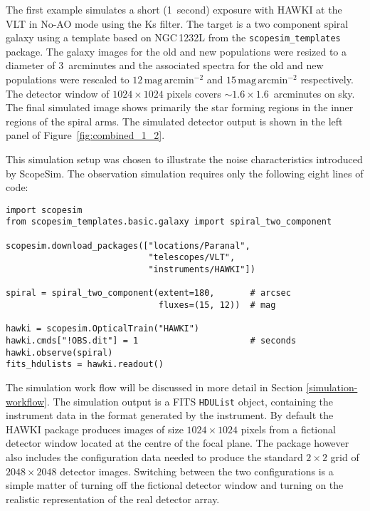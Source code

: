 The first example simulates a short (1~second) exposure with HAWKI \cite{hawki} at the VLT in No-AO mode using the Ks filter.
The target is a two component spiral galaxy using a template based on NGC\,1232L from the \lstinline{scopesim_templates} package.
The galaxy images for the old and new populations were resized to a diameter of 3~arcminutes and the associated spectra for the old and new populations \cite{brown2014} were rescaled to $12\,\mathrm{mag\,arcmin^{-2}}$ and $15\,\mathrm{mag\,arcmin^{-2}}$ respectively.
The detector window of $1024 \times 1024$ pixels covers $\sim 1.6 \times 1.6$~arcminutes on sky.
The final simulated image shows primarily the star forming regions in the inner regions of the spiral arms.
The simulated detector output is shown in the left panel of Figure~\ref{fig:combined_1_2}.

This simulation setup was chosen to illustrate the noise characteristics introduced by ScopeSim.
The observation simulation requires only the following eight lines of code:

\begin{lstlisting}[frame=single]
import scopesim
from scopesim_templates.basic.galaxy import spiral_two_component

scopesim.download_packages(["locations/Paranal",
                            "telescopes/VLT",
                            "instruments/HAWKI"])

spiral = spiral_two_component(extent=180,       # arcsec
                              fluxes=(15, 12))  # mag

hawki = scopesim.OpticalTrain("HAWKI")
hawki.cmds["!OBS.dit"] = 1                      # seconds
hawki.observe(spiral)
fits_hdulists = hawki.readout()
\end{lstlisting}

The simulation work flow will be discussed in more detail in Section \ref{simulation-workflow}.
The simulation output is a FITS \lstinline{HDUList} object, containing the instrument data in the format generated by the instrument.
By default the HAWKI package produces images of size $1024\times 1024$ pixels from a fictional detector window located at the centre of the focal plane.
The package however also includes the configuration data needed to produce the standard $2\times2$ grid of $2048\times 2048$ detector images.
Switching between the two configurations is a simple matter of turning off the fictional detector window and turning on the realistic representation of the real detector array.


